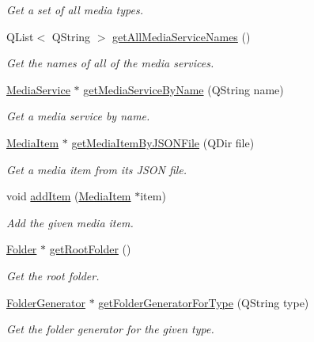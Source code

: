 \begin{DoxyCompactItemize}
\begin{DoxyCompactList}\small\item\em Get a set of all media types. \end{DoxyCompactList}\item 
Q\-List$<$ Q\-String $>$ \hyperlink{class_a_w_e_1_1_global_settings_a3289d4faf710d479678f77e8fc9fb643}{get\-All\-Media\-Service\-Names} ()
\begin{DoxyCompactList}\small\item\em Get the names of all of the media services. \end{DoxyCompactList}\item 
\hyperlink{class_a_w_e_1_1_media_service}{Media\-Service} $\ast$ \hyperlink{class_a_w_e_1_1_global_settings_abf96c9561a157168601a648f7ef72162}{get\-Media\-Service\-By\-Name} (Q\-String name)
\begin{DoxyCompactList}\small\item\em Get a media service by name. \end{DoxyCompactList}\item 
\hyperlink{class_a_w_e_1_1_media_item}{Media\-Item} $\ast$ \hyperlink{class_a_w_e_1_1_global_settings_a49108d0abd52d090d735c73812aebfd5}{get\-Media\-Item\-By\-J\-S\-O\-N\-File} (Q\-Dir file)
\begin{DoxyCompactList}\small\item\em Get a media item from its J\-S\-O\-N file. \end{DoxyCompactList}\item 
void \hyperlink{class_a_w_e_1_1_global_settings_a204b0dac2dbf0a3200289dbb05c34648}{add\-Item} (\hyperlink{class_a_w_e_1_1_media_item}{Media\-Item} $\ast$item)
\begin{DoxyCompactList}\small\item\em Add the given media item. \end{DoxyCompactList}\item 
\hyperlink{class_a_w_e_1_1_folder}{Folder} $\ast$ \hyperlink{class_a_w_e_1_1_global_settings_a958723c6d73aa7ab7574ba4c31675e5d}{get\-Root\-Folder} ()
\begin{DoxyCompactList}\small\item\em Get the root folder. \end{DoxyCompactList}\item 
\hyperlink{class_a_w_e_1_1_folder_generator}{Folder\-Generator} $\ast$ \hyperlink{class_a_w_e_1_1_global_settings_aefc464d8791fe948abb27ea542cfed90}{get\-Folder\-Generator\-For\-Type} (Q\-String type)
\begin{DoxyCompactList}\small\item\em Get the folder generator for the given type. \end{DoxyCompactList}\end{DoxyCompactItemize}
